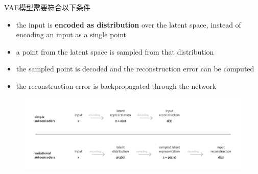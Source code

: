VAE模型需要符合以下条件
\begin{itemize}
    \item the input is \textbf{encoded as distribution} over the latent space, instead of encoding an input as a single point
    \item a point from the latent space is sampled from that distribution
    \item the sampled point is decoded and the reconstruction error can be computed
    \item the reconstruction error is backpropagated through the network
\end{itemize}
\begin{figure}[H]
    \centering
    \includegraphics[width=16cm]{images/ae_vae.png}
    \label{fig:AEvsVAE}
\end{figure}

